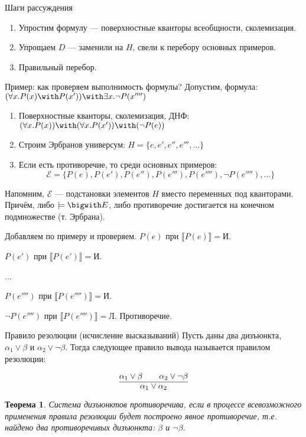 \documentclass[handout]{beamer}
\newtheorem{thm}{Теорема}[section]
\begin{document}
\begin{frame}{Шаги рассуждения}
\begin{enumerate}
\item \color{gray}Упростим формулу --- поверхностные кванторы всеобщности, сколемизация.
\item Упрощаем $D$ --- заменили на $H$, свели к перебору основных примеров.
\item \color{black}Правильный перебор.
\end{enumerate}
\end{frame}

\begin{frame}{Пример: как проверяем выполнимость формулы?}
Допустим, формула: $(\forall x.P(x)\with P(x')) \with \exists x.\neg P(x'''')$

\begin{enumerate}
\item Поверхностные кванторы, сколемизация, ДНФ: $(\forall x.P(x)) \with (\forall x.P(x')) \with (\neg P(e))$
\item Строим Эрбранов универсум: $H = \{e, e', e'', e''', \dots \}$
\item Если есть противоречие, то среди основных примеров:
$$\mathcal{E} = \{ P(e), P(e'), P(e''), P(e'''), P(e''''), \neg P(e''''), \dots \}$$
\end{enumerate}

Напомним, $\mathcal{E}$ --- подстановки элементов $H$ вместо переменных под кванторами.
Причём, либо $\models\bigwith E$, либо противоречие достигается на конечном подмножестве (т. Эрбрана).

Добавляем по примеру и проверяем.
$P(e)$ при $\llbracket P(e) \rrbracket  = \text{И}$.

$P(e')$ при $\llbracket P(e') \rrbracket = \text{И}$.

...

$P(e'''')$ при $\llbracket P(e'''') \rrbracket = \text{И}$.

$\neg P(e'''')$ при $\llbracket P(e'''') \rrbracket = \text{Л}$. Противоречие.

\end{frame}

\begin{frame}{Правило резолюции (исчисление высказываний)}
Пусть даны два дизъюнкта, $\alpha_1 \vee \beta$ и $\alpha_2 \vee \neg \beta$.
Тогда следующее правило вывода называется правилом резолюции:

$$\infer{\alpha_1\vee \alpha_2}{\alpha_1\vee \beta\quad\quad \alpha_2\vee\neg \beta}$$

\begin{thm}Система дизъюнктов противоречива, если в процессе всевозможного применения
правила резолюции будет построено явное противоречие,
т.е. найдено два противоречивых дизъюнкта: $\beta$ и $\neg\beta$.
\end{thm}
\end{frame}
\end{document}
